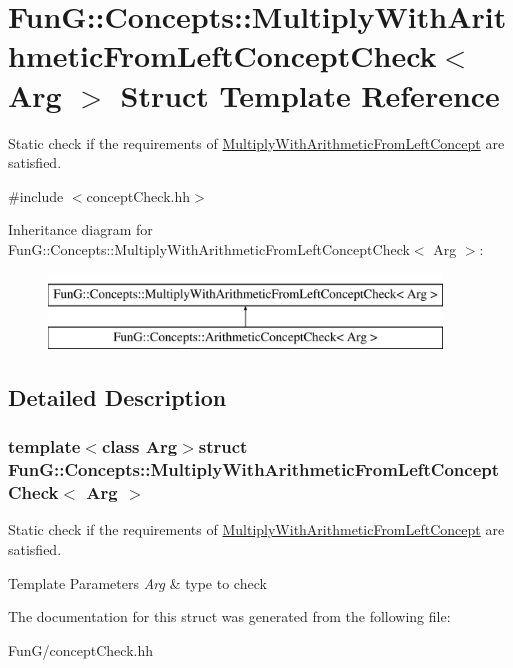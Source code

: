 \hypertarget{structFunG_1_1Concepts_1_1MultiplyWithArithmeticFromLeftConceptCheck}{\section{Fun\-G\-:\-:Concepts\-:\-:Multiply\-With\-Arithmetic\-From\-Left\-Concept\-Check$<$ Arg $>$ Struct Template Reference}
\label{structFunG_1_1Concepts_1_1MultiplyWithArithmeticFromLeftConceptCheck}
}


Static check if the requirements of \hyperlink{structFunG_1_1Concepts_1_1MultiplyWithArithmeticFromLeftConcept}{Multiply\-With\-Arithmetic\-From\-Left\-Concept} are satisfied.  




{\ttfamily \#include $<$concept\-Check.\-hh$>$}

Inheritance diagram for Fun\-G\-:\-:Concepts\-:\-:Multiply\-With\-Arithmetic\-From\-Left\-Concept\-Check$<$ Arg $>$\-:\begin{figure}[H]
\begin{center}
\leavevmode
\includegraphics[height=2.000000cm]{structFunG_1_1Concepts_1_1MultiplyWithArithmeticFromLeftConceptCheck}
\end{center}
\end{figure}


\subsection{Detailed Description}
\subsubsection*{template$<$class Arg$>$struct Fun\-G\-::\-Concepts\-::\-Multiply\-With\-Arithmetic\-From\-Left\-Concept\-Check$<$ Arg $>$}

Static check if the requirements of \hyperlink{structFunG_1_1Concepts_1_1MultiplyWithArithmeticFromLeftConcept}{Multiply\-With\-Arithmetic\-From\-Left\-Concept} are satisfied. 


\begin{DoxyTemplParams}{Template Parameters}
{\em Arg} & type to check \\
\hline
\end{DoxyTemplParams}


The documentation for this struct was generated from the following file\-:\begin{DoxyCompactItemize}
\item 
Fun\-G/concept\-Check.\-hh\end{DoxyCompactItemize}

